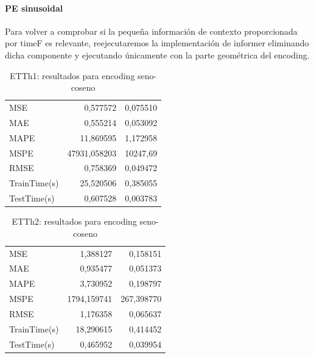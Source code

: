  
\paragraph{PE sinusoidal}
 
 Para volver a comprobar si la pequeña información de contexto proporcionada por timeF es relevante, reejecutaremos la implementación de informer eliminando dicha componente y ejecutando únicamente con la parte geométrica del encoding.\\
  
 \begin{table}[!ht]
 	\centering
 	\begin{tabular}{l|N|N}
 		\toprule
 		 &  &  \\
 		\midrule
	 	MSE & 0,577572 & 0,075510 \\
		MAE & 0,555214 & 0,053092 \\
		MAPE & 11,869595 & 1,172958 \\
		MSPE & 47931,058203 & 10247,69 \\
		RMSE & 0,758369 & 0,049472 \\
		TrainTime(s) & 25,520506 & 0,385055 \\
		TestTime(s) & 0,607528 & 0,003783 \\
 		\bottomrule
 	\end{tabular}
 	\caption{ETTh1: resultados para encoding seno-coseno}
 	\label{etth1fixed}
 \end{table}
 
 
  
 \begin{table}[!ht]
 	\centering
 	\begin{tabular}{l|N|N}
 		\toprule
 		 &  &  \\
 		\midrule
 		MSE & 1,388127 & 0,158151 \\
		MAE & 0,935477 & 0,051373 \\
		MAPE & 3,730952 & 0,198797 \\
		MSPE & 1794,159741 & 267,398770 \\
		RMSE & 1,176358 & 0,065637 \\
		TrainTime(s) & 18,290615 & 0,414452 \\
		TestTime(s) & 0,465952 & 0,039954 \\
 		\bottomrule
 	\end{tabular}
 	\caption{ETTh2: resultados para encoding seno-coseno}
 	\label{etth2fixed}
 \end{table}
 
